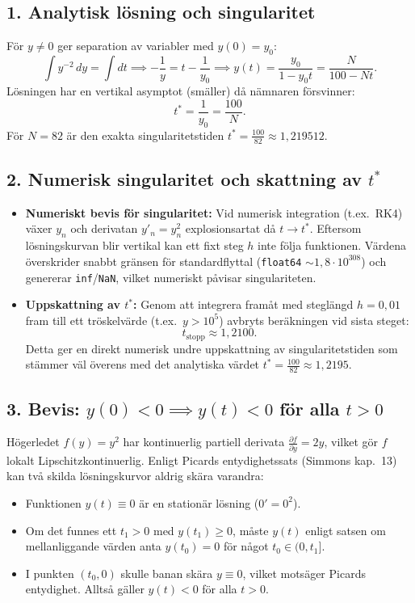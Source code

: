\documentclass{article}
\begin{document}
\subsection*{1. Analytisk lösning och singularitet}
För $y \neq 0$ ger separation av variabler med $y(0) = y_0$:
\begin{equation}
    \int y^{-2}\,dy = \int dt \implies -\frac{1}{y} = t - \frac{1}{y_0} \implies y(t) = \frac{y_0}{1 - y_0 t} = \frac{N}{100 - N t}.
\end{equation}
Lösningen har en vertikal asymptot (smäller) då nämnaren försvinner:
\begin{equation}
    t^* = \frac{1}{y_0} = \frac{100}{N}.
\end{equation}
För $N = 82$ är den exakta singularitetstiden $t^* = \frac{100}{82} \approx 1{,}219512$.

\subsection*{2. Numerisk singularitet och skattning av $t^*$}
\begin{itemize}
    \item \textbf{Numeriskt bevis för singularitet:} 
    Vid numerisk integration (t.ex.\ RK4) växer $y_n$ och derivatan $y'_n = y_n^2$ explosionsartat då $t \to t^*$. Eftersom lösningskurvan blir vertikal kan ett fixt steg $h$ inte följa funktionen. Värdena överskrider snabbt gränsen för standardflyttal (\texttt{float64} $\sim 1{,}8 \cdot 10^{308}$) och genererar \texttt{inf}/\texttt{NaN}, vilket numeriskt påvisar singulariteten.

    \item \textbf{Uppskattning av $t^*$:}
    Genom att integrera framåt med steglängd $h = 0{,}01$ fram till ett tröskelvärde (t.ex.\ $y > 10^5$) avbryts beräkningen vid sista steget:
    \[
    t_{\text{stopp}} \approx 1{,}2100.
    \]
    Detta ger en direkt numerisk undre uppskattning av singularitetstiden som stämmer väl överens med det analytiska värdet $t^* = \frac{100}{82} \approx 1{,}2195$.
\end{itemize}

\subsection*{3. Bevis: $y(0) < 0 \implies y(t) < 0$ för alla $t > 0$}
Högerledet $f(y) = y^2$ har kontinuerlig partiell derivata $\frac{\partial f}{\partial y} = 2y$, vilket gör $f$ lokalt Lipschitzkontinuerlig. Enligt Picards entydighetssats (Simmons kap.~13) kan två skilda lösningskurvor aldrig skära varandra:
\begin{itemize}
    \item Funktionen $y(t) \equiv 0$ är en stationär lösning ($0' = 0^2$).
    \item Om det funnes ett $t_1 > 0$ med $y(t_1) \ge 0$, måste $y(t)$ enligt satsen om mellanliggande värden anta $y(t_0) = 0$ för något $t_0 \in (0, t_1]$.
    \item I punkten $(t_0, 0)$ skulle banan skära $y \equiv 0$, vilket motsäger Picards entydighet. Alltså gäller $y(t) < 0$ för alla $t > 0$.
\end{itemize}
\end{document}
